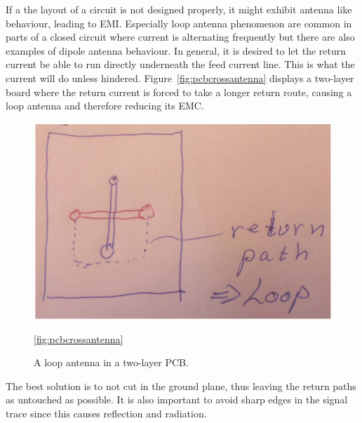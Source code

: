 If a the layout of a circuit is not designed properly, it might exhibit antenna
like behaviour, leading to EMI. Especially loop antenna phenomenon are common in
parts of a closed circuit where current is alternating frequently but there are
also examples of dipole antenna behaviour. In general, it is desired to let the
return current be able to run directly underneath the feed current line. This is
what the current will do unless hindered. Figure~\ref{fig:pcbcrossantenna}
displays a two-layer board where the return current is forced to take a longer
return route, causing a loop antenna and therefore reducing its EMC.
\begin{figure}[H]
\centering
\includegraphics[scale=0.7]{./figures/FIG_pcbcrossantenna}
\caption{A loop antenna in a two-layer PCB.}
\ref{fig:pcbcrossantenna}
\end{figure}
The best solution is to not cut in the ground plane, thus leaving the return
paths as untouched as possible. It is also important to avoid sharp edges in the
signal trace since this causes reflection and radiation. 
